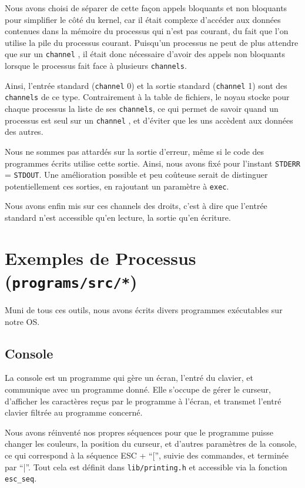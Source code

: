 \documentclass[a4paper,10pt, french]{article}
\newcommand{\code}[1]{\texttt{#1}}
\newcommand{\chan}{\texttt{channel} }
\begin{document}
Nous avons choisi de séparer de cette façon appels bloquants et non bloquants pour simplifier le côté du kernel,
car il était complexe d'accéder aux données contenues dans la mémoire du processus qui n'est pas courant,
du fait que l'on utilise la pile du processus courant.
Puisqu'un processus ne peut de plus attendre que sur un \chan, il était donc nécessaire d'avoir des appels
non bloquants lorsque le processus fait face à plusieurs \code{channels}.

Ainsi, l'entrée standard (\code{channel} 0) et la sortie standard (\code{channel} 1) sont des \code{channels} de ce type.
Contrairement à la table de fichiers, le noyau stocke pour chaque processus la liste de ses \code{channels}, 
ce qui permet de savoir quand un processus est seul sur un \chan, et d'éviter que les uns accèdent aux données des 
autres.

Nous ne sommes pas attardés sur la sortie d'erreur, même si le code des programmes écrits utilise cette
sortie. Ainsi, nous avons fixé pour l'instant \code{STDERR} = \code{STDOUT}. Une amélioration possible et peu coûteuse
serait de distinguer potentiellement ces sorties, en rajoutant un paramètre à \code{exec}.

Nous avons enfin mis sur ces channels des droits, c'est à dire que l'entrée standard n'est accessible
qu'en lecture, la sortie qu'en écriture.

\section{Exemples de Processus (\code{programs/src/*})}

Muni de tous ces outils, nous avons écrits divers programmes exécutables sur notre OS.

\subsection{Console}
La console est un programme qui gère un écran, l'entré du clavier, et communique avec un programme donné.
Elle s'occupe de gérer le curseur, d'afficher les caractères reçus par le programme à l'écran, et transmet 
l'entré clavier filtrée au programme concerné.

Nous avons réinventé nos propres séquences pour que le programme puisse changer les couleurs, la position du curseur,
et d'autres paramètres de la console, ce qui correspond à la séquence ESC + ``['', suivie des commandes, et terminée par ``|''.
Tout cela est définit dans \code{lib/printing.h} et accessible via la fonction \code{esc\_seq}.
\end{document}
